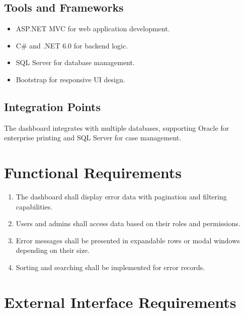 \documentclass[12pt]{article}
\begin{document}
\subsection{Tools and Frameworks}
\begin{itemize}
    \item ASP.NET MVC for web application development.
    \item C\# and .NET 6.0 for backend logic.
    \item SQL Server for database management.
    \item Bootstrap for responsive UI design.
\end{itemize}

\subsection{Integration Points}
The dashboard integrates with multiple databases, supporting Oracle for enterprise printing and SQL Server for case management.

\section{Functional Requirements}
\begin{enumerate}
    \item The dashboard shall display error data with pagination and filtering capabilities.
    \item Users and admins shall access data based on their roles and permissions.
    \item Error messages shall be presented in expandable rows or modal windows depending on their size.
    \item Sorting and searching shall be implemented for error records.
\end{enumerate}

\section{External Interface Requirements}
\end{document}

